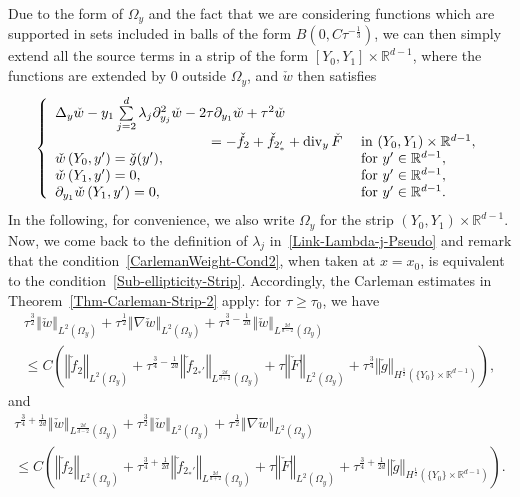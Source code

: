 \documentclass[10pt]{amsart}
\theoremstyle{definition}\newtheorem{defi}[theo]{Definition}\newtheorem{rema}[theo]{Remark}\newtheorem{exam}[theo]{Example}\newtheorem{exem}[theo]{Example}\newtheorem{nota}[theo]{Notation}
\newcommand*\R{\mathbb{R}}
\newcommand{\norm}[1]{\left\Vert#1\right\Vert}
\renewcommand{\leq}{\leqslant}
\renewcommand{\geq}{\geqslant}
\newcommand{\divv}{\mathrm{div}}
\begin{document}
Due to the form of $\Omega_y$ and the fact that we are considering functions which are supported in sets included in balls of the form $B(0, C \tau^{-\frac{1}{3}})$, we can then simply extend all the source terms in a strip of the form $[Y_0, Y_1] \times \R^{d-1}$, where the functions are extended by $0$ outside $\Omega_y$, and $\check w$ then satisfies
\begin{equation}\label{Elliptic-Strip-check w}
\left\{
\begin{array}{ll}
\Delta_y \check w-y_{1} \sum\limits_{j=2}^{d} \lambda_{j} \partial_{y_j}^{2} \check w - 2 \tau \partial_{y_1} \check w + \tau^2 \check w \\
\mkern200mu=- \check f_2 + \check f_{2_*'} +\divv_y\, \check F & \text { in } (Y_0, Y_1) \times \R^{d-1},
\\
\check w\left(Y_{0}, y'\right)=\check g (y'), &\text{ for } y' \in \R^{d-1},
\\
\check w\left(Y_{1}, y'\right)= 0, &\text{ for } y' \in \R^{d-1},
\\
\partial_{y_1} \check w\left(Y_{1}, y'\right)= 0, &\text{ for } y' \in \R^{d-1}.
\end{array}
\right.
\end{equation}
In the following, for convenience, we also write $\Omega_y$ for the strip $(Y_0, Y_1) \times \R^{d-1}$. Now, we come back to the definition of $\lambda_j$ in~\eqref{Link-Lambda-j-Pseudo} and remark that the condition~\eqref{CarlemanWeight-Cond2}, when taken at $x = x_0$, is equivalent to the condition~\eqref{Sub-ellipticity-Strip}. Accordingly, the Carleman estimates in Theorem~\ref{Thm-Carleman-Strip-2} apply: for $\tau \geq \tau_0$, we have
\begin{multline*}
\tau^{\frac{3}{2}} \norm{\check w}_{L^2\left(\Omega_y\right)} +
\tau^{\frac{1}{2}} \norm{\nabla \check w}_{L^2\left(\Omega_y\right)} +
\tau^{\frac{3}{4}- \frac{1}{2d}} \norm{\check w}_{L^{\frac{2d}{d-2}}\left(\Omega_y\right)}
\\
\leq C\left(
\norm{\check f_2}_{L^2\left(\Omega_y\right)} +
\tau^{\frac{3}{4}- \frac{1}{2d}} \norm{\check f_{2_*'}}_{L^{\frac{2d}{d+2}}\left(\Omega_y\right)} +
\tau \norm{\check F}_{L^2\left(\Omega_y\right)} +
\tau^{\frac{3}{4}} \norm{\check g}_{H^{\frac{1}{2}}\left(\{Y_0\} \times \R^{d-1}\right)}
\right),
\end{multline*}
and
\begin{multline*}
\tau^{\frac{3}{4}+ \frac{1}{2d}} \norm{\check w}_{L^{\frac{2d}{d-2}}(\Omega_y)} +
\tau^{\frac{3}{2}} \norm{\check w }_{L^2(\Omega_y)} +
\tau^{\frac{1}{2}} \norm{ \nabla \check w}_{L^2(\Omega_y)}
\\
\leq C\left(
\norm{\check f_2}_{L^2(\Omega_y)} +
\tau^{\frac{3}{4}+ \frac{1}{2d}} \norm{ \check f_{2_*'} }_{L^{\frac{2d}{d+2}}(\Omega_y)} +
\tau \norm{ \check F }_{L^2(\Omega_y)} +
\tau^{\frac{3}{4}+\frac{1}{2d}} \norm{ \check g }_{H^{\frac{1}{2}}\left(\{Y_0\} \times \R^{d-1}\right)}
\right).
\end{multline*}
\end{document}
